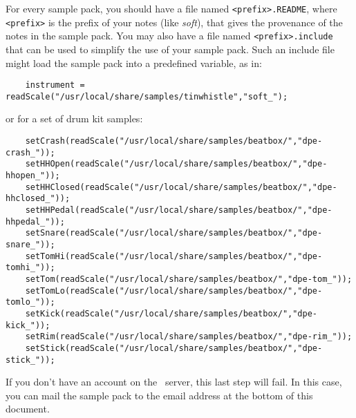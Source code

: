 \documentclass{article}
\begin{document}
For every sample pack,
you should have a file named \verb!<prefix>.README!, where
\verb!<prefix>! is the prefix of your notes (like {\it soft}), that gives
the provenance of the notes in the sample pack. You may
also have a file named \verb!<prefix>.include!
that can be used to simplify the use of your sample pack. Such
an include file might load the sample pack into a predefined
variable, as in:

\begin{verbatim}
    instrument = readScale("/usr/local/share/samples/tinwhistle","soft_");
\end{verbatim}

or for a set of drum kit samples:

\begin{verbatim}
    setCrash(readScale("/usr/local/share/samples/beatbox/","dpe-crash_"));
    setHHOpen(readScale("/usr/local/share/samples/beatbox/","dpe-hhopen_"));
    setHHClosed(readScale("/usr/local/share/samples/beatbox/","dpe-hhclosed_"));
    setHHPedal(readScale("/usr/local/share/samples/beatbox/","dpe-hhpedal_"));
    setSnare(readScale("/usr/local/share/samples/beatbox/","dpe-snare_"));
    setTomHi(readScale("/usr/local/share/samples/beatbox/","dpe-tomhi_"));
    setTom(readScale("/usr/local/share/samples/beatbox/","dpe-tom_"));
    setTomLo(readScale("/usr/local/share/samples/beatbox/","dpe-tomlo_"));
    setKick(readScale("/usr/local/share/samples/beatbox/","dpe-kick_"));
    setRim(readScale("/usr/local/share/samples/beatbox/","dpe-rim_"));
    setStick(readScale("/usr/local/share/samples/beatbox/","dpe-stick_"));
\end{verbatim}


If you don't have an account on the \songlib\ server, this last step will fail.
In this case, you can mail the sample pack to the email address at the
bottom of this document.
\end{document}
